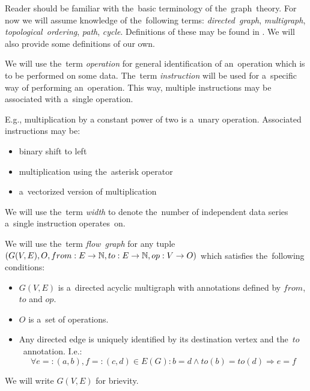Reader should be familiar with the~basic terminology of the~graph~theory. For now we will assume knowledge of the~following terms: \emph{directed~graph}, \emph{multigraph}, \emph{topological~ordering}, \emph{path}, \emph{cycle}. Definitions of these may be found in \cite{kapitoly}. We will also provide some definitions of our own.

\begin{define}
We will use the~term \emph{operation} for general identification of an~operation which is to be performed on some data. The~term \emph{instruction} will be used for a~specific way of performing an~operation. This way, multiple instructions may be associated with a~single operation.
\end{define}

E.g., multiplication by a constant power of two is a~unary operation. Associated instructions may be:
\begin{itemize}
  \item binary shift to left
  \item multiplication using the~asterisk operator
  \item a~vectorized version of multiplication
\end{itemize}

\begin{define}
We will use the~term \emph{width} to denote the~number of independent data series a~single instruction operates~on.
\end{define}

\begin{define}
We will use the~term \emph{flow~graph} for any tuple $(G(V,E),O,from:E \rightarrow \mathbb{N}, to:E \rightarrow \mathbb{N}, op:V \rightarrow O)$ which satisfies the~following conditions:
\begin{itemize}
  \item $G(V,E)$ is a~directed acyclic multigraph with annotations defined by $from$, $to$ and $op$.
  \item $O$ is a~set of operations.
  \item Any directed edge is uniquely identified by its destination vertex and the~$to$~annotation. I.e.:
    $$ \forall{e=:(a,b),f=:(c,d)} \in {E(G)}: b = d \wedge to(b) = to(d) \Rightarrow e = f $$
\end {itemize}
    We will write $G(V,E)$ for brievity.
\end{define}

